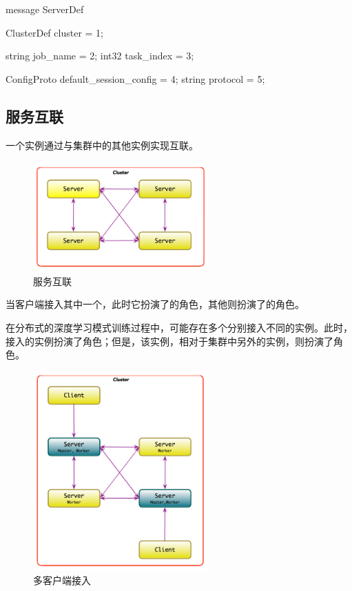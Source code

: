\begin{content}
\begin{leftbar}
\begin{python}
message ServerDef {
  ClusterDef cluster = 1;
  
  string job_name = 2;
  int32 task_index = 3;

  ConfigProto default_session_config = 4;
  string protocol = 5;
}
\end{python}
\end{leftbar}

\subsection{服务互联}

一个实例通过与集群中的其他实例实现互联。

\begin{figure}[H]
\centering
\includegraphics[width=0.6\textwidth]{figures/cc-server-interact.png}
\caption{服务互联}
 \label{fig:cc-server-interact}
\end{figure}

当客户端接入其中一个，此时它扮演了的角色，其他则扮演了的角色。

在分布式的深度学习模式训练过程中，可能存在多个分别接入不同的实例。此时，接入的实例扮演了角色；但是，该实例，相对于集群中另外的实例，则扮演了角色。

\begin{figure}[H]
\centering
\includegraphics[width=0.6\textwidth]{figures/cc-server-interact-2.png}
\caption{多客户端接入}
 \label{fig:cc-server-interact-2}
\end{figure}


\end{content}
